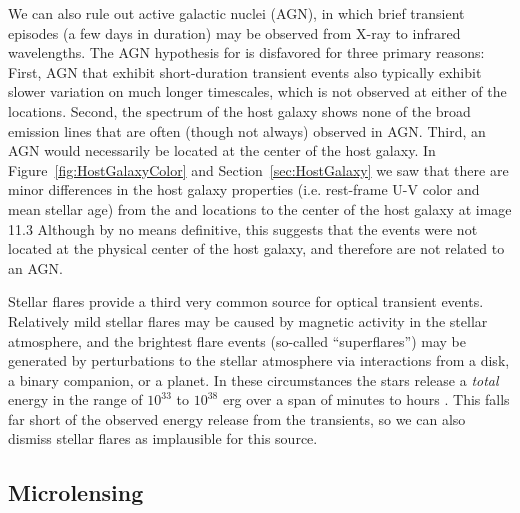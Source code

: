 We can also rule out active galactic nuclei (AGN), in which brief
transient episodes (a few days in duration) may be observed from
X-ray to infrared wavelengths.
The AGN hypothesis
for \spock is disfavored for three primary reasons:
First, AGN that exhibit short-duration transient events also typically
exhibit slower variation on much longer timescales, which is not
observed at either of the \spock locations. Second, the spectrum
of the \spock host galaxy shows none of the broad emission lines that
are often (though not always) observed in AGN.  Third, an AGN would
necessarily be located at the center of the host galaxy.
In Figure~\ref{fig:HostGalaxyColor} and Section~\ref{sec:HostGalaxy}
we saw that there are minor differences in the host galaxy properties
(i.e. rest-frame U-V color and mean stellar age) from the \spockone
and \spocktwo locations to the center of the host galaxy at image 11.3
Although by no means definitive, this suggests that the \spock events
were not located at the physical center of the host galaxy, and
therefore are not related to an AGN.

Stellar flares provide a third very common source for optical
transient events. Relatively mild stellar flares may be caused by
magnetic activity in the stellar atmosphere, and the brightest flare
events (so-called ``superflares'') may be generated by perturbations
to the stellar atmosphere via interactions from a disk, a binary
companion, or a planet.  In these circumstances the stars release a
{\em total} energy in the range of $10^{33}$ to $10^{38}$ erg over a
span of minutes to hours \citep{Balona:2012,Karoff:2016}. This falls
far short of the observed energy release from the \spock transients,
so we can also dismiss stellar flares as implausible for this source.

\subsection{Microlensing}

